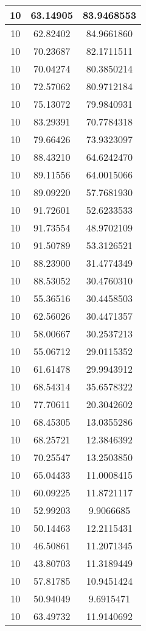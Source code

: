 \documentclass[
]{book}
\begin{document}
\begin{tabular}{c|c|c}
\hline
10 & 63.14905 & 83.9468553\\
\hline
10 & 62.82402 & 84.9661860\\
\hline
10 & 70.23687 & 82.1711511\\
\hline
10 & 70.04274 & 80.3850214\\
\hline
10 & 72.57062 & 80.9712184\\
\hline
10 & 75.13072 & 79.9840931\\
\hline
10 & 83.29391 & 70.7784318\\
\hline
10 & 79.66426 & 73.9323097\\
\hline
10 & 88.43210 & 64.6242470\\
\hline
10 & 89.11556 & 64.0015066\\
\hline
10 & 89.09220 & 57.7681930\\
\hline
10 & 91.72601 & 52.6233533\\
\hline
10 & 91.73554 & 48.9702109\\
\hline
10 & 91.50789 & 53.3126521\\
\hline
10 & 88.23900 & 31.4774349\\
\hline
10 & 88.53052 & 30.4760310\\
\hline
10 & 55.36516 & 30.4458503\\
\hline
10 & 62.56026 & 30.4471357\\
\hline
10 & 58.00667 & 30.2537213\\
\hline
10 & 55.06712 & 29.0115352\\
\hline
10 & 61.61478 & 29.9943912\\
\hline
10 & 68.54314 & 35.6578322\\
\hline
10 & 77.70611 & 20.3042602\\
\hline
10 & 68.45305 & 13.0355286\\
\hline
10 & 68.25721 & 12.3846392\\
\hline
10 & 70.25547 & 13.2503850\\
\hline
10 & 65.04433 & 11.0008415\\
\hline
10 & 60.09225 & 11.8721117\\
\hline
10 & 52.99203 & 9.9066685\\
\hline
10 & 50.14463 & 12.2115431\\
\hline
10 & 46.50861 & 11.2071345\\
\hline
10 & 43.80703 & 11.3189449\\
\hline
10 & 57.81785 & 10.9451424\\
\hline
10 & 50.94049 & 9.6915471\\
\hline
10 & 63.49732 & 11.9140692\\

\end{tabular}
\end{document}
